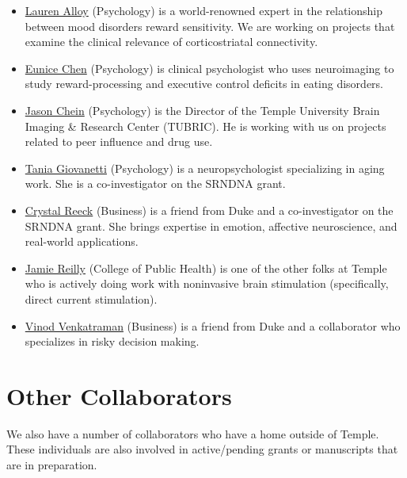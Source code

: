 \documentclass[letterpaper,12pt,oneside]{memoir}
\begin{document}
\begin{itemize}

\item\href{http://www.cla.temple.edu/psychology/faculty/lauren-alloy/}{Lauren Alloy} (Psychology) is a world-renowned expert in the relationship between mood disorders reward sensitivity. We are working on projects that examine the clinical relevance of corticostriatal connectivity.
\item\href{http://www.cla.temple.edu/psychology/faculty/eunice-chen/}{Eunice Chen} (Psychology) is clinical psychologist who uses neuroimaging to study reward-processing and executive control deficits in eating disorders.
\item\href{http://www.cla.temple.edu/tunl/people.html}{Jason Chein} (Psychology) is the Director of the Temple University Brain Imaging \& Research Center (TUBRIC). He is working with us on projects related to peer influence and drug use.
\item\href{http://www.cla.temple.edu/psychology/faculty/tania-giovanetti/}{Tania Giovanetti} (Psychology) is a neuropsychologist specializing in aging work. She is a co-investigator on the SRNDNA grant. 
\item\href{https://www.fox.temple.edu/mcm_people/crystal-reeck/}{Crystal Reeck} (Business) is a friend from Duke and a co-investigator on the SRNDNA grant. She brings expertise in emotion, affective neuroscience, and real-world applications. 
\item\href{http://www.reilly-coglab.com/reilly/}{Jamie Reilly} (College of Public Health) is one of the other folks at Temple who is actively doing work with noninvasive brain stimulation (specifically, direct current stimulation).
\item\href{https://www.fox.temple.edu/mcm_people/vinod-venkatraman/}{Vinod Venkatraman} (Business) is a friend from Duke and a collaborator who specializes in risky decision making.

\end{itemize}


\section{Other Collaborators}

We also have a number of collaborators who have a home outside of Temple. These individuals are also involved in active/pending grants or manuscripts that are in preparation. 
\end{document}
